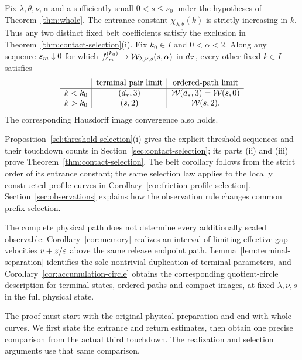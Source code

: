 \begin{corollary}
\label{cor:belt-contact-selection}
Fix $\lambda,\theta,\nu,\mathbf n$ and a sufficiently small
$0<s\le s_0$ under the hypotheses of Theorem~\ref{thm:whole}.
The entrance constant $\chi_{\lambda,\theta}(k)$ is strictly increasing
in $k$. Thus any two distinct fixed belt coefficients satisfy the
exclusion in Theorem~\ref{thm:contact-selection}\textup{(i)}.
Fix $k_0\in I$ and $0<\alpha<2$. Along any sequence
$\varepsilon_m\downarrow0$ for which
$f_{\varepsilon_m}^{(k_0)}\to\mathcal W_{\lambda,\nu,s}(s,\alpha)$ in $d_{\mathrm F}$,
every other fixed $k\in I$ satisfies
\[
\begin{array}{c|c|c}
 &\text{terminal pair limit}&\text{ordered-path limit}\\ \hline
 k<k_0 &(d_*,3)&\mathcal W(d_*,3)=\mathcal W(s,0)\\
 k>k_0 &(s,2)&\mathcal W(s,2).
\end{array}
\]
The corresponding Hausdorff image convergence also holds.
\end{corollary}

Proposition~\ref{sel:threshold-selection}\textup{(i)} gives the
explicit threshold sequences and their touchdown counts in
Section~\ref{sec:contact-selection}; its parts \textup{(ii)} and
\textup{(iii)} prove Theorem~\ref{thm:contact-selection}.
The belt corollary follows
from the strict order of its entrance constant; the same selection
law applies to the locally constructed profile curves in
Corollary~\ref{cor:friction-profile-selection}. Section~\ref{sec:observations}
explains how the observation rule changes common prefix selection.

The complete physical path does not determine every additionally
scaled observable: Corollary~\ref{cor:memory} realizes an interval of
limiting effective-gap velocities $v+z/\varepsilon$ above the same release
endpoint path. Lemma~\ref{lem:terminal-separation} identifies the sole
nontrivial duplication of terminal parameters, and
Corollary~\ref{cor:accumulation-circle} obtains the corresponding
quotient-circle description for terminal states, ordered paths and
compact images, at fixed $\lambda,\nu,s$ in the full physical state.

The proof must start with the original physical preparation and end
with whole curves. We first state the entrance and return estimates,
then obtain one precise comparison from the actual third touchdown.
The realization and selection arguments use that same comparison.
